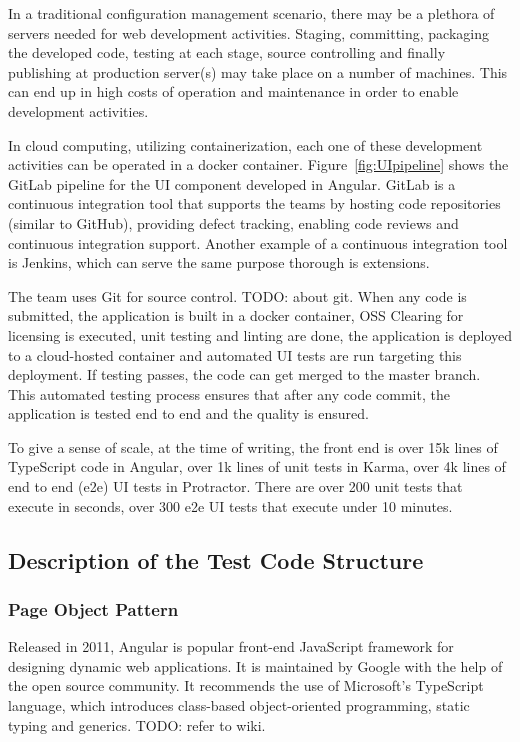 \documentclass[conference]{IEEEtran}
\newcommand{\todo}[1]{}
\renewcommand{\todo}[1]{{\color{red} TODO: {#1}}}
\begin{document}
	In a traditional configuration management scenario, there may be a plethora of servers needed for web development activities.
	Staging, committing, packaging the developed code, testing at each stage, source controlling and finally publishing at production server(s) may take place on a number of machines.
	This can end up in high costs of operation and maintenance in order to enable development activities.
	
	In cloud computing, utilizing containerization, each one of these development activities can be operated in a docker container.
	Figure~\ref{fig:UIpipeline} shows the GitLab pipeline for the UI component developed in Angular.
	GitLab is a continuous integration tool that supports the teams by hosting code repositories (similar to GitHub), providing defect tracking, enabling code reviews and continuous integration support. 
	Another example of a continuous integration tool is Jenkins, which can serve the same purpose thorough is extensions.


	The team uses Git for source control. \todo{about git}. 
	When any code is submitted, the application is built in a docker container, OSS Clearing for licensing is executed, unit testing and linting are done, the application is deployed to a cloud-hosted container and automated UI tests are run targeting this deployment.
	If testing passes, the code can get merged to the master branch. 
	This automated testing process ensures that after any code commit, the application is tested end to end and the quality is ensured. 
	
	To give a sense of scale, at the time of writing, the front end is over 15k lines of TypeScript code in Angular, over 1k lines of unit tests in Karma, over 4k lines of end to end (e2e) UI tests in Protractor. 
	There are over 200 unit tests that execute in seconds, over 300 e2e UI tests that execute under 10 minutes. 



\subsection{Description of the Test Code Structure}

	\subsubsection{Page Object Pattern}

	Released in 2011, Angular is popular front-end JavaScript framework for designing dynamic web applications.
	It is maintained by Google with the help of the open source community.
	It recommends the use of Microsoft's TypeScript language, which introduces class-based object-oriented programming, static typing and generics. \todo{refer to wiki}.
\end{document}
